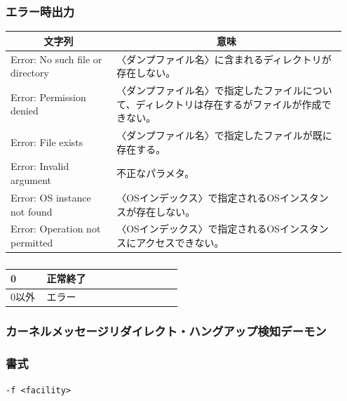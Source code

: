 \documentclass[twoside,11pt,fleqn]{book}
\begin{document}
\subsubsection*{エラー時出力} 
\begin{table}[!h]
\footnotesize
\begin{tabular}{|p{0.30\linewidth}|p{0.65\linewidth}|} \hline
\multicolumn{1}{|c}{\textbf{文字列}}&\multicolumn{1}{|c|}{\textbf{意味}}\\ \hline \hline
Error: No such file or directory& 〈ダンプファイル名〉に含まれるディレクトリが存在しない。\\ \hline
Error: Permission denied &〈ダンプファイル名〉で指定したファイルについて、ディレクトリは存在するがファイルが作成できない。\\ \hline
Error: File exists &〈ダンプファイル名〉で指定したファイルが既に存在する。\\ \hline
Error: Invalid argument &不正なパラメタ。\\ \hline
Error: OS instance not found&〈OSインデックス〉で指定されるOSインスタンスが存在しない。\\ \hline
Error: Operation not permitted&〈OSインデックス〉で指定されるOSインスタンスにアクセスできない。\\ \hline
\end{tabular}
\vspace{-0em}
\end{table}
\FloatBarrier

\subsubsection*{}
\begin{table}[!h]
\footnotesize
\begin{tabular}{|p{0.20\linewidth}|p{0.75\linewidth}|} \hline
0&正常終了\\ \hline
0以外&エラー\\ \hline
\end{tabular}
\vspace{-0em}
\end{table}
\FloatBarrier

\subsubsection{カーネルメッセージリダイレクト・ハングアップ検知デーモン}\label{sec:ihkmond}
\subsubsection*{書式}{\quad} \texttt{{\lbrack}-f <facility>{\rbrack}} 
\end{document}
